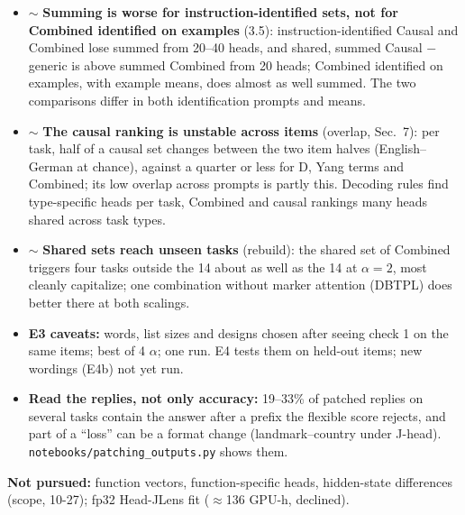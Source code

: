 \documentclass[10pt,a4paper]{article}
\newcommand{\mixed}{\textcolor{orange!80!black}{$\sim$}}
\begin{document}
\begin{itemize}
\item \mixed{} \textbf{Summing is worse for instruction-identified sets, not for Combined identified on examples} (3.5): instruction-identified Causal and Combined lose summed from 20--40 heads, and shared, summed Causal $-$ generic is above summed Combined from 20 heads; Combined identified on examples, with example means, does almost as well summed. The two comparisons differ in both identification prompts and means.
\item \mixed{} \textbf{The causal ranking is unstable across items} (overlap, Sec.~7): per task, half of a causal set changes between the two item halves (English--German at chance), against a quarter or less for D, Yang terms and Combined; its low overlap across prompts is partly this. Decoding rules find type-specific heads per task, Combined and causal rankings many heads shared across task types.
\item \mixed{} \textbf{Shared sets reach unseen tasks} (rebuild): the shared set of Combined triggers four tasks outside the 14 about as well as the 14 at $\alpha=2$, most cleanly capitalize; one combination without marker attention (DBTPL) does better there at both scalings.
\item \textbf{E3 caveats:} words, list sizes and designs chosen after seeing check 1 on the same items; best of 4 $\alpha$; one run. E4 tests them on held-out items; new wordings (E4b) not yet run.
\item \textbf{Read the replies, not only accuracy:} 19--33\% of patched replies on several tasks contain the answer after a prefix the flexible score rejects, and part of a ``loss'' can be a format change (landmark--country under J-head). \texttt{notebooks/patching\_outputs.py} shows them.
\end{itemize}

\textbf{Not pursued:} function vectors, function-specific heads, hidden-state differences (scope, 10-27); fp32 Head-JLens fit ($\approx$136 GPU-h, declined).
\end{document}
